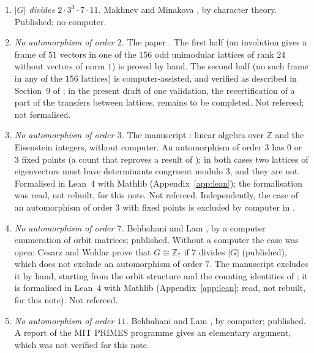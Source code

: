 \documentclass[11pt]{amsart}
\theoremstyle{remark}
\newcommand{\Z}{\mathbb{Z}}
\begin{document}
\begin{enumerate}[label=\textup{(\Alph*)},leftmargin=2.4em]
\item \emph{$|G|$ divides $2\cdot3^3\cdot7\cdot11$.} Makhnev and Minakova \cite{MM04}, by character theory. Published;
no computer.
\item \emph{No automorphism of order $2$.} The paper \cite{C2}. The first half (an involution gives a frame of $51$
vectors in one of the $156$ odd unimodular lattices of rank $24$ without vectors of norm $1$) is proved by hand. The
second half (no such frame in any of the $156$ lattices) is computer-assisted, and verified as described in Section~9 of \cite{C2}; in the present draft of \cite{C2} one
validation, the recertification of a part of the transfers between lattices, remains to be completed. Not refereed; not
formalised.
\item \emph{No automorphism of order $3$.} The manuscript \cite{D3}: linear algebra over $\Z$ and the Eisenstein integers,
without computer. An automorphism of order $3$ has $0$ or $3$ fixed points (a count that reproves a result of \cite{MM04});
in both cases two lattices of eigenvectors must have determinants congruent modulo $3$, and they are not. Formalised
in Lean~4 with Mathlib (Appendix~\ref{app:lean}); the formalisation was read, not rebuilt, for this note.  Not refereed. Independently, the case of an automorphism of order $3$ with fixed points
is excluded by computer in \cite{B09,BL11}.
\item \emph{No automorphism of order $7$.} Behbahani and Lam \cite{B09,BL11}, by a computer enumeration of orbit matrices;
published. Without a computer the case was open: Cesarz and Woldar \cite{CW25} prove that $G\cong\Z_7$ if $7$ divides $|G|$
(published), which does not exclude an automorphism of order $7$. The manuscript \cite{D7} excludes it by hand, starting from the orbit structure and the counting identities of \cite{CW25}; it is formalised in Lean~4 with Mathlib
(Appendix~\ref{app:lean}; read, not rebuilt, for this note).  Not refereed.
\item \emph{No automorphism of order $11$.} Behbahani and Lam \cite{B09,BL11}, by computer; published. A report of the
MIT PRIMES programme \cite{LM14} gives an elementary argument, which was not verified for this note.
\end{enumerate}
\end{document}

